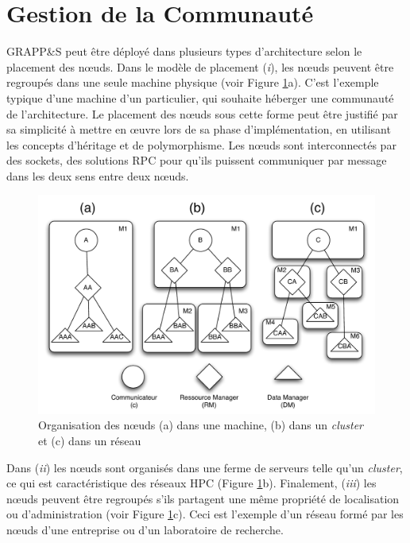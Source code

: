 \section{Gestion de la Communauté\label{SEC:Community}}

GRAPP\&S peut être déployé dans plusieurs types d'architecture selon le placement des n{\oe}uds. Dans le modèle de placement (\textit{i}), les n{\oe}uds peuvent être regroupés dans une seule machine physique (voir Figure \ref{fig:noeuds}a). C'est l'exemple typique d'une machine d'un particulier, qui souhaite héberger une communauté de l'architecture. Le placement des n{\oe}uds sous cette forme peut être justifié par sa simplicité à mettre en {\oe}uvre lors de sa phase d'implémentation, en utilisant les concepts d'héritage et de polymorphisme. Les n{\oe}uds sont interconnectés par des sockets, des solutions RPC pour qu'ils puissent communiquer par message dans les deux sens entre deux n{\oe}uds. 

\begin{figure}
	\centering
	\includegraphics[width=0.85\linewidth]{img/noeuds.pdf} 
	\caption{Organisation des n{\oe}uds (a) dans une machine, (b) dans un \textit{cluster} et (c) dans un réseau\label{fig:noeuds}}
\end{figure}

Dans (\textit{ii}) les n{\oe}uds sont organisés dans une ferme de serveurs telle qu'un \textit{cluster}, ce qui est caractéristique des réseaux HPC (Figure \ref{fig:noeuds}b). Finalement, (\textit{iii}) les n{\oe}uds peuvent être regroupés s'ils partagent une même propriété de localisation ou d'administration (voir Figure \ref{fig:noeuds}c). Ceci est l'exemple d'un réseau formé par les n{\oe}uds d'une entreprise ou d'un laboratoire de recherche. 

